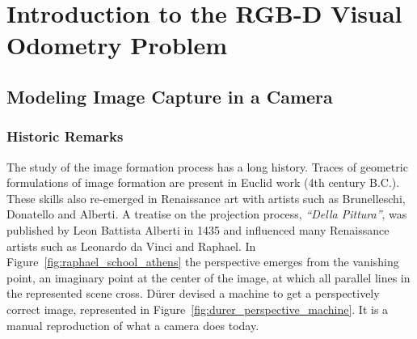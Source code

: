 \chapter{Introduction to the RGB-D Visual Odometry Problem}%
\label{cha:rgbd_vo}

\minitoc%
\clearpage

\section{Modeling Image Capture in a Camera}%
\label{sec:image-formation}

\subsection{Historic Remarks}%
\label{sub:historic_remarks}

The study of the image formation process has a long history.
Traces of geometric formulations of image formation are present
in Euclid work (4th century B.C.).
These skills also re-emerged in Renaissance art with artists such as
Brunelleschi, Donatello and Alberti.
A treatise on the projection process, \textit{``Della Pittura''},
was published by Leon Battista Alberti in 1435 and influenced
many Renaissance artists such as Leonardo da Vinci and Raphael.
In Figure~\ref{fig:raphael_school_athens}
the perspective emerges from the vanishing point,
an imaginary point at the center of the image,
at which all parallel lines in the represented scene cross.
D\"urer devised a machine to get a perspectively correct image,
represented in Figure~\ref{fig:durer_perspective_machine}.
It is a manual reproduction of what a camera does today.

